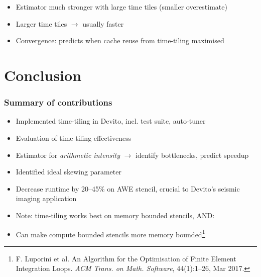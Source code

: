 \documentclass{beamer}
\begin{document}
\begin{frame}
\begin{itemize}
	\item Estimator much stronger with large time tiles (smaller overestimate)
	\item Larger time tiles \(\rightarrow\) usually faster
	\item Convergence: predicts when cache reuse from time-tiling maximised
\end{itemize}
\end{frame}



\section{Conclusion}

\begin{frame}
\frametitle{Summary of contributions}

\begin{itemize}
	\item Implemented time-tiling in Devito, incl. test suite, auto-tuner
	\item Evaluation of time-tiling effectiveness
	\item Estimator for \emph{arithmetic intensity} \(\rightarrow\) identify bottlenecks, predict speedup
	\item Identified ideal skewing parameter
	\item Decrease runtime by 20--45\% on AWE stencil, crucial to Devito's seismic imaging application
	\newline
	\item Note: time-tiling works best on memory bounded stencils, AND:
	\item Can make compute bounded stencils more memory bounded\footnote{F. Luporini et al. An Algorithm for the Optimisation of Finite Element Integration Loops. \emph{ACM Trans. on Math. Software}, 44(1):1--26, Mar 2017.}
\end{itemize}
\end{frame}
\end{document}
